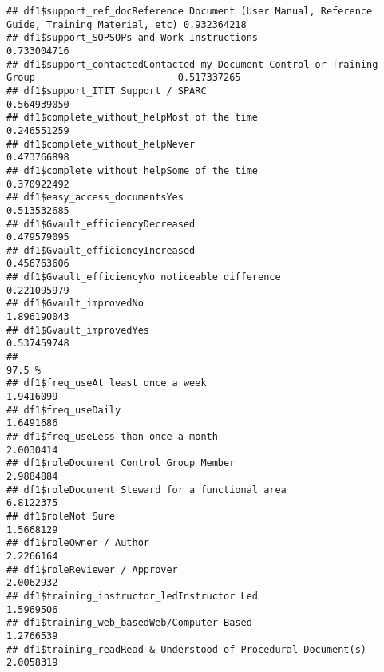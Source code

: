 \documentclass[
]{article}
\begin{document}
\begin{verbatim}
## df1$support_ref_docReference Document (User Manual, Reference Guide, Training Material, etc) 0.932364218
## df1$support_SOPSOPs and Work Instructions                                                    0.733004716
## df1$support_contactedContacted my Document Control or Training Group                         0.517337265
## df1$support_ITIT Support / SPARC                                                             0.564939050
## df1$complete_without_helpMost of the time                                                    0.246551259
## df1$complete_without_helpNever                                                               0.473766898
## df1$complete_without_helpSome of the time                                                    0.370922492
## df1$easy_access_documentsYes                                                                 0.513532685
## df1$Gvault_efficiencyDecreased                                                               0.479579095
## df1$Gvault_efficiencyIncreased                                                               0.456763606
## df1$Gvault_efficiencyNo noticeable difference                                                0.221095979
## df1$Gvault_improvedNo                                                                        1.896190043
## df1$Gvault_improvedYes                                                                       0.537459748
##                                                                                                   97.5 %
## df1$freq_useAt least once a week                                                               1.9416099
## df1$freq_useDaily                                                                              1.6491686
## df1$freq_useLess than once a month                                                             2.0030414
## df1$roleDocument Control Group Member                                                          2.9884884
## df1$roleDocument Steward for a functional area                                                 6.8122375
## df1$roleNot Sure                                                                               1.5668129
## df1$roleOwner / Author                                                                         2.2266164
## df1$roleReviewer / Approver                                                                    2.0062932
## df1$training_instructor_ledInstructor Led                                                      1.5969506
## df1$training_web_basedWeb/Computer Based                                                       1.2766539
## df1$training_readRead & Understood of Procedural Document(s)                                   2.0058319

\end{verbatim}
\end{document}
